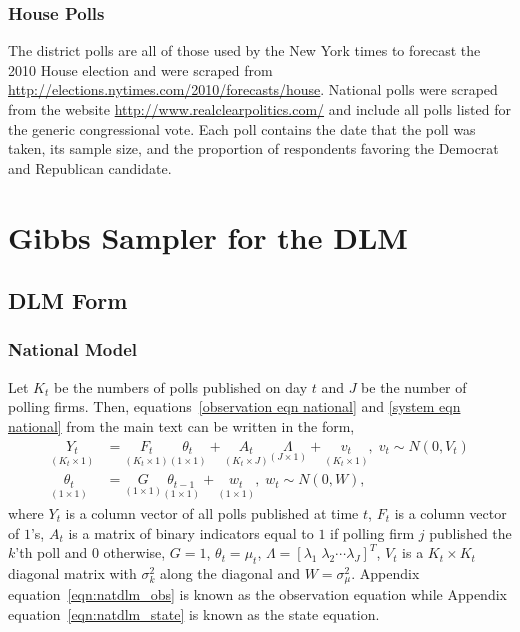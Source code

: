 \documentclass[12pt,final,fleqn]{article}
\theoremstyle{plain}
\begin{document}
\subsubsection{House Polls}
The district polls are all of those used by the New York times to forecast the 2010 House election and  were scraped from \url{http://elections.nytimes.com/2010/forecasts/house}. National polls were scraped from the website \url{http://www.realclearpolitics.com/} and include all polls listed for the generic congressional vote. Each poll contains the date that the poll was taken, its sample size, and the proportion of respondents favoring the Democrat and Republican candidate. 

\section{Gibbs Sampler for the DLM} \label{sec: Gibbs}
\subsection{DLM Form} \label{sec: DLM Form}
\subsubsection{National Model} 
Let $K_t$ be the numbers of polls published on day $t$ and $J$ be the number of polling firms. Then, equations~\ref{observation eqn national} and \ref{system eqn national} from the main text can be written in the form,
\begin{align}
\label{eqn:natdlm_obs}
\underset{(K_t \times 1)}{Y_t} &= \underset{(K_t \times 1)}{F_t} \underset{(1 \times 1)}{\theta_t} + \underset{(K_t \times J)}{A_t} \underset{(J \times 1)}{\Lambda} + \underset{(K_t \times 1)}{v_t},\; v_t \sim N(0, V_t)\\
\label{eqn:natdlm_state}
\underset{(1 \times 1)}{\theta_t} &= \underset{(1 \times 1)}{G}\underset{(1 \times 1)}{\theta_{t-1}} + \underset{(1 \times 1)}{w_t},\; w_t \sim N(0, W),
\end{align}
where $Y_t$ is a column vector of all polls published at time $t$, $F_t$ is a column vector of $1$'s, $A_t$ is a matrix of binary indicators equal to $1$ if polling firm $j$ published the $k$'th poll and $0$ otherwise, $G=1$, $\theta_t = \mu_t$, $\Lambda =[\lambda_1\; \lambda_2\cdots \lambda_J]^T$,  $V_t$ is a $K_t \times K_t$ diagonal matrix with $\sigma^2_k$ along the diagonal and $W=\sigma^2_\mu$. Appendix equation~\ref{eqn:natdlm_obs} is known as the observation equation while Appendix equation~\ref{eqn:natdlm_state} is known as the state equation. 
\end{document}
